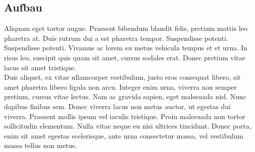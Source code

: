 \subsection{Aufbau}

Aliquam eget tortor augue.
Praesent bibendum blandit felis, pretium mattis leo pharetra at.
Duis rutrum dui a est pharetra tempor.
Suspendisse potenti. Suspendisse potenti.
Vivamus ac lorem eu metus vehicula tempus et et urna.
In risus leo, suscipit quis quam sit amet, cursus sodales erat.
Donec pretium vitae lacus sit amet tristique.\\
Duis aliquet, ex vitae ullamcorper vestibulum, justo eros consequat libero, sit amet pharetra libero ligula non arcu.
Integer enim urna, viverra non semper pretium, cursus vitae lectus.
Nam ac gravida sapien, eget malesuada nisl.
Nunc dapibus finibus sem.
Donec viverra lacus non metus auctor, ut egestas dui viverra.
Praesent mollis ipsum vel iaculis tristique.
Proin malesuada non tortor sollicitudin elementum.
Nulla vitae neque eu nisi ultrices tincidunt.
Donec porta, enim sit amet egestas scelerisque, ante urna consectetur massa, vel vestibulum massa tellus non metus.
